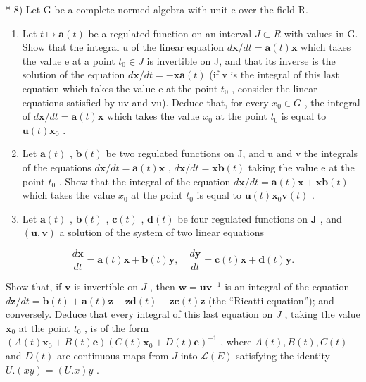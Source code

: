 * 8) Let G be a complete normed algebra with unit e over the field R.

\begin{enumerate}
\def\labelenumi{\alph{enumi})}
\item
  Let \(t \mapsto \mathbf{a}(t)\) be a regulated function on an interval \(J \subset R\) with values in G. Show that the integral u of the linear equation \(d\mathbf{x}/dt = \mathbf{a}(t)\mathbf{x}\) which takes the value e at a point \(t_0 \in J\) is invertible on J, and that its inverse is the solution of the equation \(d\mathbf{x}/dt = -\mathbf{x}\mathbf{a}(t)\) (if v is the integral of this last equation which takes the value e at the point \(t_0\) , consider the linear equations satisfied by uv and vu). Deduce that, for every \(x_0 \in G\) , the integral of \(d\mathbf{x}/dt = \mathbf{a}(t)\mathbf{x}\) which takes the value \(x_0\) at the point \(t_0\) is equal to \(\mathbf{u}(t)\mathbf{x}_0\) .
\item
  Let \(\mathbf{a}(t)\) , \(\mathbf{b}(t)\) be two regulated functions on J, and u and v the integrals of the equations \(d\mathbf{x}/dt = \mathbf{a}(t)\mathbf{x}\) , \(d\mathbf{x}/dt = \mathbf{x}\mathbf{b}(t)\) taking the value e at the point \(t_{0}\) . Show that the integral of the equation \(d\mathbf{x}/dt = \mathbf{a}(t)\mathbf{x} + \mathbf{x}\mathbf{b}(t)\) which takes the value \(x_{0}\) at the point \(t_{0}\) is equal to \(\mathbf{u}(t)\mathbf{x}_{0}\mathbf{v}(t)\) .
\item
  Let \(\mathbf{a}(t)\) , \(\mathbf{b}(t)\) , \(\mathbf{c}(t)\) , \(\mathbf{d}(t)\) be four regulated functions on \(\mathbf{J}\) , and \((\mathbf{u}, \mathbf{v})\) a solution of the system of two linear equations
\end{enumerate}

\[
\frac {d \mathbf {x}}{d t} = \mathbf {a} (t) \mathbf {x} + \mathbf {b} (t) \mathbf {y}, \quad \frac {d \mathbf {y}}{d t} = \mathbf {c} (t) \mathbf {x} + \mathbf {d} (t) \mathbf {y}.
\]

Show that, if \(\mathbf{v}\) is invertible on \(J\) , then \(\mathbf{w} = \mathbf{u}\mathbf{v}^{-1}\) is an integral of the equation \(d\mathbf{z}/dt = \mathbf{b}(t) + \mathbf{a}(t)\mathbf{z} - \mathbf{z}\mathbf{d}(t) - \mathbf{z}\mathbf{c}(t)\mathbf{z}\) (the ``Ricatti equation''); and conversely. Deduce that every integral of this last equation on \(J\) , taking the value \(\mathbf{x}_0\) at the point \(t_0\) , is of the form \((A(t)\mathbf{x}_0 + B(t)\mathbf{e})(C(t)\mathbf{x}_0 + D(t)\mathbf{e})^{-1}\) , where \(A(t), B(t), C(t)\) and \(D(t)\) are continuous maps from \(J\) into \(\mathcal{L}(E)\) satisfying the identity \(U.(xy) = (U.x)y\) .

